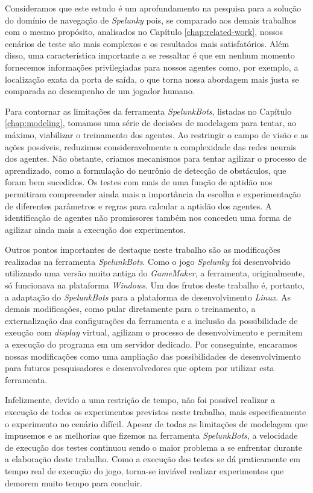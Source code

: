 Consideramos que este estudo é um aprofundamento na pesquisa para a solução do
domínio de navegação de \textit{Spelunky} pois, se comparado aos demais
trabalhos com o mesmo propósito, analisados no Capítulo \ref{chap:related-work},
nossos cenários de teste são mais complexos e os resultados mais satisfatórios.
Além disso, uma característica importante a se ressaltar é que em nenhum momento
fornecemos informações privilegiadas para nossos agentes como, por exemplo, a
localização exata da porta de saída, o que torna nossa abordagem mais justa se
comparada ao desempenho de um jogador humano.

Para contornar as limitações da ferramenta \textit{SpelunkBots}, listadas no
Capítulo \ref{chap:modeling}, tomamos uma série de decisões de modelagem para
tentar, ao máximo, viabilizar o treinamento dos agentes. Ao restringir o campo
de visão e as ações possíveis, reduzimos consideravelmente a complexidade das
redes neurais dos agentes. Não obstante, criamos mecanismos para tentar agilizar
o processo de aprendizado, como a formulação do neurônio de detecção de
obstáculos, que foram bem sucedidos. Os testes com mais de uma função de aptidão
nos permitiram compreender ainda mais a importância da escolha e experimentação
de diferentes parâmetros e regras para calcular a aptidão dos agentes. A
identificação de agentes não promissores também nos concedeu uma forma de
agilizar ainda mais a execução dos experimentos.

Outros pontos importantes de destaque neste trabalho são as modificações
realizadas na ferramenta \textit{SpelunkBots}. Como o jogo \textit{Spelunky} foi
desenvolvido utilizando uma versão muito antiga do \textit{GameMaker}, a
ferramenta, originalmente, só funcionava na plataforma \textit{Windows}. Um dos
frutos deste trabalho é, portanto, a adaptação do \textit{SpelunkBots} para a
plataforma de desenvolvimento \textit{Linux}. As demais modificações, como pular
diretamente para o treinamento, a externalização das configurações da ferramenta
e a inclusão da possibilidade de exeução com \textit{display} virtual, agilizam
o processo de desenvolvimento e permitem a execução do programa em um servidor
dedicado. Por conseguinte, encaramos nossas modificações como uma ampliação das
possibilidades de desenvolvimento para futuros pesquisadores e desenvolvedores
que optem por utilizar esta ferramenta.

Infelizmente, devido a uma restrição de tempo, não foi possível realizar a
execução de todos os experimentos previstos neste trabalho, mais especificamente
o experimento no cenário difícil.  Apesar de todas as limitações de modelagem
que impusemos e as melhorias que fizemos na ferramenta \textit{SpelunkBots}, a
velocidade de execução dos testes continuou sendo o maior problema a se
enfrentar durante a elaboração deste trabalho. Como a execução dos testes se dá
praticamente em tempo real de execução do jogo, torna-se inviável realizar
experimentos que demorem muito tempo para concluir.

